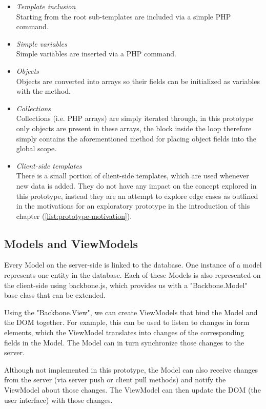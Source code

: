 \documentclass[thesis.tex]{subfiles}
\begin{document}
\begin{itemize}
	\item \emph{Template inclusion}\\
	Starting from the root sub-templates are included via a simple
	PHP  command.
	\item \emph{Simple variables}\\
	Simple variables are inserted via a PHP  command.
	\item \emph{Objects}\\
	Objects are converted into arrays so their fields can be initialized as
	variables with the  method.
	\item \emph{Collections}\\
	Collections (i.e. PHP arrays) are simply iterated through, in this prototype
	only objects are present in these arrays, the block inside the
	 loop therefore simply contains the aforementioned method
	for placing object fields into the global scope.
	\item \emph{Client-side templates}\\
	There is a small portion of client-side templates, which are used whenever new
	data is added.  They do not have any impact on the concept explored in
	this prototype, instead they are an attempt to explore edge cases as outlined
	in the motivations for an exploratory prototype in the introduction of this
	chapter (\ref{list:prototype-motivation}).
\end{itemize}

\subsection{Models and ViewModels}
Every Model on the server-side is linked to the database.
One instance of a model represents one entity in the database.
Each of these Models is also represented on the client-side using backbone.js,
which provides us with a "Backbone.Model" base class that can be extended.

Using the "Backbone.View", we can create ViewModels that bind the Model and the
DOM together. For example, this can be used to listen to changes in
form elements, which the ViewModel translates into changes of the corresponding
fields in the Model. The Model can in turn synchronize those changes to the
server.

Although not implemented in this prototype, the Model can also receive changes
from the server (via server push or client pull methods) and notify
the ViewModel about those changes. The ViewModel can then update the
DOM (the user interface) with those changes.
\end{document}

